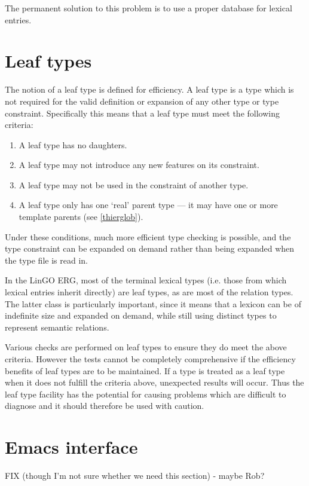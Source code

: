 \documentclass[12pt]{report}
\begin{document}
The permanent solution to this problem is to use a proper database for 
lexical entries.

\section{Leaf types}
\label{leaftypes}

The notion of a leaf type is defined for efficiency.  A leaf type
is a type which is not required for the valid definition or expansion of
any other type or type constraint.  
Specifically this means that a leaf type
must meet the following criteria:
\begin{enumerate}
\item A leaf type has no daughters.
\item A leaf type may not introduce any new features on its constraint.
\item A leaf type may not be used in the constraint of another type.
\item A leaf type only has one `real' parent type --- it may have one or more
template parents (see \ref{thierglob}).
\end{enumerate}
Under these conditions, much more efficient type checking is possible,
and the type constraint can be expanded on demand rather than being expanded 
when the type file is read in.

In the LinGO ERG, most of the terminal lexical types (i.e. those from 
which lexical entries inherit directly) are leaf types, as are most of
the relation types.  The latter class is particularly important,
since it means that a lexicon can be of indefinite size and expanded on
demand, while still using distinct types to represent semantic relations.

Various checks are performed on leaf types to ensure they do meet
the above criteria.  However the tests cannot be completely comprehensive
if the efficiency benefits of leaf types are to be maintained.
If a type is treated as a leaf type when it does not fulfill the
criteria above, unexpected results will occur.  Thus
the leaf type facility has the potential for causing 
problems which are difficult to diagnose and it should therefore be
used with caution.


\section{Emacs interface}
\label{emacs}

FIX (though I'm not sure whether we need this section) - maybe Rob?
\end{document}
